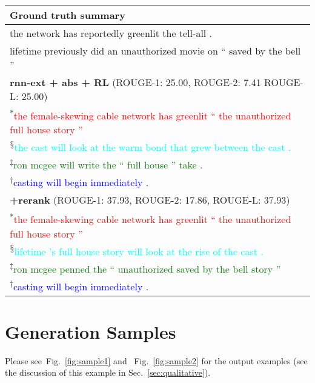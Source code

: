 \documentclass[11pt,a4paper]{article}
\def\figref#1{Fig.~\ref{#1}}
\def\secref#1{Sec.~\ref{#1}}
\begin{document}
\begin{figure*}[t]
\begin{tabular*}{\textwidth}{| p{} | }
  \\ \hline
  \textbf{Ground truth summary} \\ \hline
          the network has reportedly greenlit the tell-all . \\
        lifetime previously did an unauthorized movie on `` saved by the bell '' \\
  \hline
  \textbf{rnn-ext + abs + RL} (ROUGE-1: 25.00, ROUGE-2: 7.41 ROUGE-L: 25.00)\\ \hline
  \textsuperscript{*}\textcolor{red}{the female-skewing cable network has greenlit `` the unauthorized full house story ''} \\
\textsuperscript{$\mathsection$}\textcolor{cyan}{the cast will look at the warm bond that grew between the cast .} \\
\textsuperscript{$\ddagger$}\textcolor{green}{ron mcgee will write the `` full house '' take .} \\
\textsuperscript{$\dagger$}\textcolor{blue}{casting will begin immediately .} \\ \hline
  \textbf{+rerank} (ROUGE-1: 37.93, ROUGE-2: 17.86, ROUGE-L: 37.93)\\ \hline
  \textsuperscript{*}\textcolor{red}{the female-skewing cable network has greenlit `` the unauthorized full house story ''} \\
\textsuperscript{$\mathsection$}\textcolor{cyan}{lifetime 's full house story will look at the rise of the cast .} \\
\textsuperscript{$\ddagger$}\textcolor{green}{ron mcgee penned the `` unauthorized saved by the bell story ''} \\
\textsuperscript{$\dagger$}\textcolor{blue}{casting will begin immediately .} \\
  \hline
\end{tabular*}
\caption{
Example from the dataset showing the generated summary of our best models. 
The colored (marked) sentences correspond to our extractor's sentence selection.
The listed ROUGE scores are computed for this specific example.
}
\label{fig:sample2}
\end{figure*} 
\section{Generation Samples}
\label{sec:samples}
Please see~\figref{fig:sample1}  and ~\figref{fig:sample2} for the output examples (see the discussion of this example in \secref{sec:qualitative}).
\clearpage

 
\end{document}
